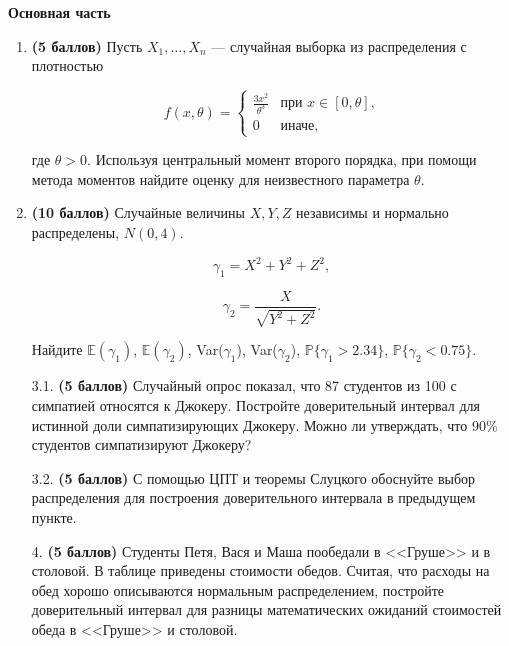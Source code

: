 \documentclass[12pt]{article} %
\begin{document}
\setcounter{page}{1}

\begin{center}
    \textbf{Основная часть}
\end{center}


\begin{enumerate}


\item \textbf{(5 баллов)} Пусть $X_1, \dots, X_n$ --- случайная выборка из распределения с плотностью

\begin{equation*}
f(x, \theta) = 
 \begin{cases}
   \frac{3x^2}{\theta^3} &\text{при $x \in [0,\theta]$,}\\
   0 &\text{иначе,}
 \end{cases}
\end{equation*}

где $\theta > 0$. Используя центральный момент второго порядка, при помощи метода моментов найдите оценку для неизвестного параметра $\theta$.

\item \textbf{(10 баллов)} Случайные величины $X, Y, Z$ независимы и нормально распределены, $N(0, 4)$.

\[
\gamma_1 = X^2 + Y^2 + Z^2,
\]

\[
\gamma_2 = \frac{X}{\sqrt{Y^2 + Z^2}}.
\]

Найдите $\mathbb{E}(\gamma_1)$, $\mathbb{E}(\gamma_2)$, Var($\gamma_1$),  Var($\gamma_2$), $\mathbb{P}\{\gamma_1 > 2.34\}$, $\mathbb{P}\{\gamma_2 < 0.75\}$.

\item[3.1.] \textbf{(5 баллов)} Случайный опрос показал, что 87 студентов из 100 с симпатией относятся к Джокеру. Постройте доверительный интервал для истинной доли симпатизирующих Джокеру. Можно ли утверждать, что 90\% студентов симпатизируют Джокеру? 

\item[3.2.] \textbf{(5 баллов)} С помощью ЦПТ и теоремы Слуцкого обоснуйте выбор распределения для построения доверительного интервала в предыдущем пункте.

\item[4.] \textbf{(5 баллов)} Студенты Петя, Вася и Маша пообедали в <<Груше>> и в столовой. В таблице приведены стоимости обедов. Считая, что расходы на обед хорошо описываются нормальным распределением, постройте доверительный интервал для разницы математических ожиданий стоимостей обеда в <<Груше>> и столовой.


\end{enumerate}
\end{document}
